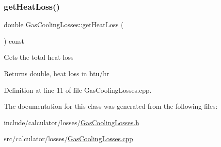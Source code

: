 \subsubsection{\texorpdfstring{get\+Heat\+Loss()}{getHeatLoss()}}
{\footnotesize\ttfamily double Gas\+Cooling\+Losses\+::get\+Heat\+Loss (\begin{DoxyParamCaption}{ }\end{DoxyParamCaption}) const}

Gets the total heat loss \begin{DoxyReturn}{Returns}
double, heat loss in btu/hr 
\end{DoxyReturn}


Definition at line 11 of file Gas\+Cooling\+Losses.\+cpp.



The documentation for this class was generated from the following files\+:\begin{DoxyCompactItemize}
\item 
include/calculator/losses/\hyperlink{_gas_cooling_losses_8h}{Gas\+Cooling\+Losses.\+h}\item 
src/calculator/losses/\hyperlink{_gas_cooling_losses_8cpp}{Gas\+Cooling\+Losses.\+cpp}\end{DoxyCompactItemize}
